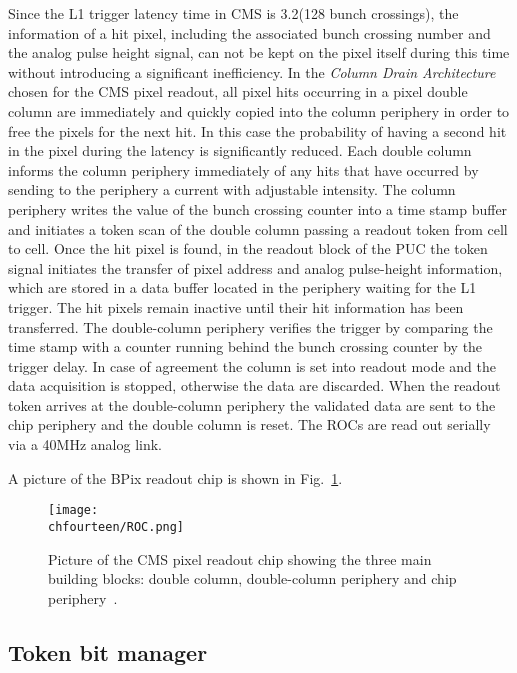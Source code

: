 Since the L1 trigger latency time in CMS is 3.2\mus (128 bunch crossings), the information of a hit pixel, including the associated bunch crossing number and the analog pulse height signal, can not be kept on the pixel itself during this time without introducing a significant inefficiency. In the {\itshape Column Drain Architecture} chosen for the CMS pixel readout, all pixel hits occurring in a pixel double column are immediately and quickly copied into the column periphery in order to free the pixels for the next hit. In this case the probability of having a second hit in the pixel during the latency is significantly reduced.
Each double column informs the column periphery immediately of any hits that have occurred by sending to the periphery a current with adjustable intensity.
The column periphery writes the value of the bunch crossing counter into a time stamp buffer and initiates a token scan of the double column passing a readout token from cell to cell.
Once the hit pixel is found, in the readout block of the PUC the token signal initiates the transfer of pixel address and analog pulse-height information, which are stored in a data buffer located in the periphery waiting for the L1 trigger. The hit pixels remain inactive until their hit information has been transferred.
The double-column periphery verifies the trigger by comparing the time stamp with a counter running behind the bunch crossing counter by the trigger delay. In case of agreement the column is set into readout mode and the data acquisition is stopped, otherwise the data are discarded. When the readout token arrives at the double-column periphery the validated data are sent to the chip periphery and the double column is reset. The ROCs are read out serially via a 40\unit{MHz} analog link.

A picture of the BPix readout chip is shown in Fig.~\ref{fig:ROC}.

\begin{figure}[!htb]
 \begin{center}
 \texttt{[image: \\chfourteen/ROC.png]}
 \end{center}
 \caption{Picture of the CMS pixel readout chip showing the three main building blocks: double column, double-column periphery and chip periphery~\cite{Chatrchyan:2008zzk}.}
 \label{fig:ROC}
\end{figure}

\subsection{Token bit manager}\label{subsec:BPix_TBM}

